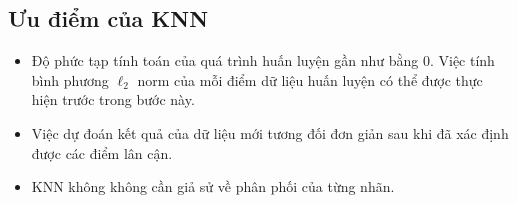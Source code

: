 





\subsection{Ưu điểm của KNN}
\begin{itemize}
    \item Độ phức tạp tính toán của quá trình huấn luyện gần như bằng 0. Việc tính bình phương $\ell_2$ norm của mỗi điểm dữ liệu huấn luyện có thể được thực hiện trước trong bước này.

    \item Việc dự đoán kết quả của dữ liệu mới tương đối đơn giản sau khi đã xác
    định được các điểm lân cận.

    \item KNN không không cần giả sử về phân phối của từng nhãn.
\end{itemize}



